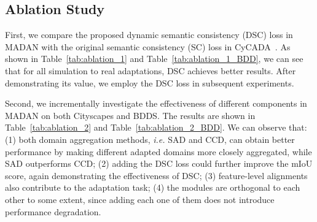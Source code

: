 \documentclass{article}
\begin{document}
\subsection{Ablation Study}
First, we compare the proposed dynamic semantic consistency (DSC) loss in MADAN with the original semantic consistency (SC) loss in CyCADA~\cite{hoffman2018cycada}. As shown in Table~\ref{tab:ablation_1} and Table~\ref{tab:ablation_1_BDD}, we can see that for all simulation to real adaptations, DSC achieves better results. After demonstrating its value, we employ the DSC loss in subsequent experiments.

Second, we incrementally investigate the effectiveness of different components in MADAN on both Cityscapes and BDDS. The results are shown in Table~\ref{tab:ablation_2} and Table~\ref{tab:ablation_2_BDD}. We can observe that: (1) both domain aggregation methods, \textit{i.e.} SAD and CCD, can obtain better performance by making different adapted domains more closely aggregated, while SAD outperforms CCD; (2) adding the DSC loss could further improve the mIoU score, again demonstrating the effectiveness of DSC; (3) feature-level alignments also contribute to the adaptation task; (4) the modules are orthogonal to each other to some extent, since adding each one of them does not introduce performance degradation.
\end{document}
